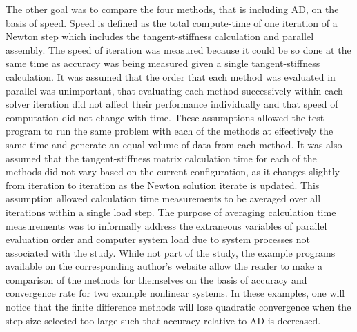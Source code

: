 \documentclass[preprint,12pt]{elsarticle}
\begin{document}
The other goal was to compare the four methods, that is including AD, on the basis of speed. Speed is defined as the total compute-time of one iteration of a Newton step which includes the tangent-stiffness calculation and parallel assembly. The speed of iteration was measured because it could be so done at the same time as accuracy was being measured given a single tangent-stiffness calculation.  It was assumed that the order that each method was evaluated in parallel was unimportant, that evaluating each method successively within each solver iteration did not affect their performance individually and that speed of computation did not change with time. These assumptions allowed the test program to run the same problem with each of the methods at effectively the same time and generate an equal volume of data from each method. It was also assumed that the tangent-stiffness matrix calculation time for each of the methods did not vary based on the current configuration, as it changes slightly from iteration to iteration as the Newton solution iterate is updated.  This assumption allowed calculation time measurements to be averaged over all iterations within a single load step. The purpose of averaging calculation time measurements was to informally address the extraneous variables of parallel evaluation order and computer system load due to system processes not associated with the study. While not part of the study, the example programs available on the corresponding author's website allow the reader to make a comparison of the methods for themselves on the basis of accuracy and convergence rate for two example nonlinear systems. In these examples, one will notice that the finite difference methods will lose quadratic convergence when the step size selected too large such that accuracy relative to AD is decreased.
\end{document}
